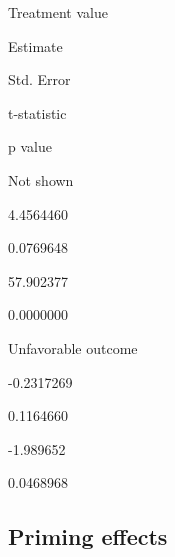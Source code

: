 \documentclass[]{book}
\begin{document}
Treatment value

Estimate

Std. Error

t-statistic

p value

Not shown

4.4564460

0.0769648

57.902377

0.0000000

Unfavorable outcome

-0.2317269

0.1164660

-1.989652

0.0468968

\subsection{Priming effects}\label{priming-effects}
\end{document}
